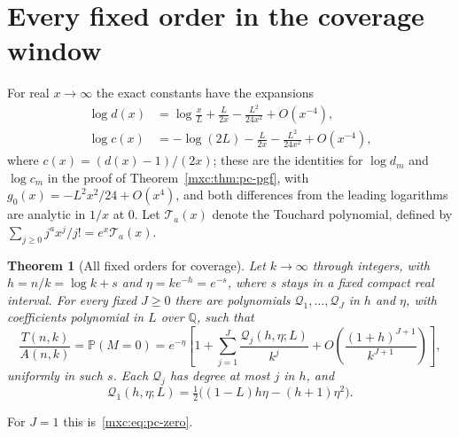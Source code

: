\documentclass[11pt]{article}
\numberwithin{equation}{section}
\newtheorem{theorem}{Theorem}[section]
\theoremstyle{definition}
\theoremstyle{remark}
\newcommand{\Pp}{\mathbb P}
\begin{document}
\section{Every fixed order in the coverage window}\label{mxc:tp:sec:couponall}

For real $x\to\infty$ the exact constants have the expansions
\begin{align}
 \log d(x)&=\log\frac xL+\frac{L}{2x}-\frac{L^2}{24x^2}+O(x^{-4}),
 \label{mxc:tp:eq:logd}\\
 \log c(x)&=-\log(2L)-\frac{L}{2x}-\frac{L^2}{24x^2}+O(x^{-4}),
 \label{mxc:tp:eq:logc}
\end{align}
where $c(x)=(d(x)-1)/(2x)$; these are the identities for $\log d_m$ and
$\log c_m$ in the proof of Theorem~\ref{mxc:thm:pc-pgf}, with
$g_0(x)=-L^2x^2/24+O(x^4)$, and both differences from the leading
logarithms are analytic in $1/x$ at $0$. Let $\mathcal T_a(x)$ denote the
Touchard polynomial, defined by
$\sum_{j\ge0}j^ax^j/j!=e^x\mathcal T_a(x)$.

\begin{theorem}[All fixed orders for coverage]\label{mxc:tp:thm:couponall}
Let $k\to\infty$ through integers, with $h=n/k=\log k+s$ and
$\eta=ke^{-h}=e^{-s}$, where $s$ stays in a fixed compact real interval.
For every fixed $J\ge0$ there are polynomials
$\mathcal Q_1,\ldots,\mathcal Q_J$ in $h$ and $\eta$, with coefficients
polynomial in $L$ over $\mathbb Q$, such that
\begin{equation}\label{mxc:tp:eq:couponall}
 \frac{T(n,k)}{A(n,k)}=\Pp(M=0)=e^{-\eta}
 \left[1+\sum_{j=1}^{J}\frac{\mathcal Q_j(h,\eta;L)}{k^j}
 +O\!\left(\frac{(1+h)^{J+1}}{k^{J+1}}\right)\right],
\end{equation}
uniformly in such $s$. Each $\mathcal Q_j$ has degree at most $j$ in
$h$, and
\[
 \mathcal Q_1(h,\eta;L)=\tfrac12\bigl((1-L)h\eta-(h+1)\eta^2\bigr).
\]
\end{theorem}
For $J=1$ this is~\eqref{mxc:eq:pc-zero}.
\end{document}
